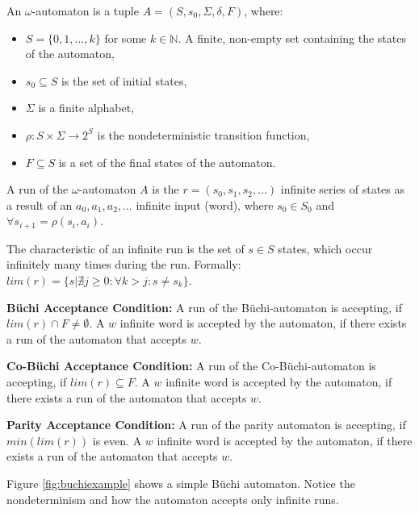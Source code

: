 \begin{definition}
	An $\omega$-automaton is a tuple $A=(S, s_0, \Sigma, \delta, F)$, where:
	\begin{itemize}
		\item $S=\{0,1, ..., k\}$ for some $k \in \mathbb{N}$. A finite, non-empty set containing the states of the automaton, 
		\item $s_0 \subseteq S$ is the set of initial states,
		\item $\Sigma$ is a finite alphabet,
		\item $\rho : S \times \Sigma \rightarrow 2^S$ is the nondeterministic transition function,
		\item $F \subseteq S$ is a set of the final states of the automaton.
	\end{itemize}
	
	A run of the $\omega$-automaton $A$ is the $r=(s_0,s_1,s_2,...)$ infinite series of states as a result of an $a_0, a_1, a_2, ...$ infinite input (word), where $s_0 \in S_0$ and $\forall s_{i+1}=\rho(s_i, a_i)$. 
	
	The characteristic of an infinite run is the set of $s \in S$ states, which occur infinitely many times during the run. Formally: $lim(r) = \{s | \nexists j \geq 0 : \forall k > j : s \neq s_k\}$. 
	
	\textbf{Büchi Acceptance Condition:} A run of the Büchi-automaton is accepting, if $lim(r) \cap F \neq \emptyset$. A $ w $ infinite word is accepted by the automaton, if there exists a run of the automaton that accepts $w$.
	
	\textbf{Co-Büchi Acceptance Condition:} A run of the Co-Büchi-automaton is accepting, if $lim(r) \subseteq F$. A $ w $ infinite word is accepted by the automaton, if there exists a run of the automaton that accepts $w$.
	
	\textbf{Parity Acceptance Condition:} A run of the parity automaton is accepting, if $min(lim(r))$ is even. A $ w $ infinite word is accepted by the automaton, if there exists a run of the automaton that accepts $w$.
\end{definition}

\begin{example}
	\label{ex:buchiexample}
	Figure \ref{fig:buchiexample} shows a simple Büchi automaton. Notice the nondeterminism and how the automaton accepts only infinite runs. 
\end{example}

